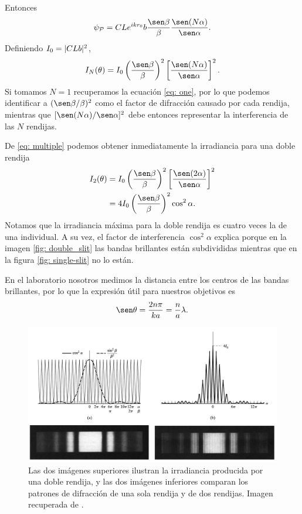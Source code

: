 \begin{multicols}{2}
Entonces
\begin{equation}
	\psi_\mathcal{P} = CL\eto{ikr_0}  b\frac{\sen \beta}{\beta} \frac{\sen (N\alpha)}{\sen \alpha}.
\end{equation}
Definiendo $I_0 = \lvert CLb\rvert^2$,
\begin{equation}\label{eq: multiple}
	I_N(\theta) = I_0 \left( \frac{\sen \beta}{\beta}\right)^2 \left[ \frac{\sen (N\alpha)}{\sen \alpha}\right]^2.
\end{equation}
Si tomamos $N=1$ recuperamos la ecuación \eqref{eq: one}, por lo que podemos identificar a $(\sen \beta/\beta)^2$ como el factor de difracción causado por cada rendija, mientras que $[\sen(N\alpha)/\sen \alpha]^2$ debe entonces representar la interferencia de las $N$ rendijas.

De \eqref{eq: multiple} podemos obtener inmediatamente la irradiancia para una doble rendija
\begin{equation}
\begin{split}
	I_2(\theta) &= I_0 \left( \frac{\sen \beta}{\beta}\right)^2 \left[ \frac{\sen (2\alpha)}{\sen \alpha}\right]^2\\
	&= 4I_0  \left( \frac{\sen \beta}{\beta}\right)^2 \cos^2\alpha.
\end{split}
\end{equation}
Notamos que la irradiancia máxima para la doble rendija es cuatro veces la de una individual. A su vez, el factor de interferencia $\cos^2 \alpha$ explica porque en la imagen \ref{fig: double_slit} las bandas brillantes están subdivididas mientras que en la figura \ref{fig: single-slit} no lo están.

En el laboratorio nosotros medimos la distancia entre los centros de las bandas brillantes, por lo que la expresión útil para nuestros objetivos es
	\begin{equation}\label{eq: maxima}
		\sen \theta = \frac{2n\pi}{ka} = \frac{n}{a}\lambda.
	\end{equation}
\end{multicols}
\begin{figure}[htb!]
	\centering
	\includegraphics[width=.7\linewidth]{Imagenes/compare}
	\caption{Las dos imágenes superiores ilustran la irradiancia producida por una doble rendija, y las dos imágenes inferiores comparan los patrones de difracción de una sola rendija y de dos rendijas. Imagen recuperada de \parencite{pedrotti}.}
	\label{fig: compare}
\end{figure}
